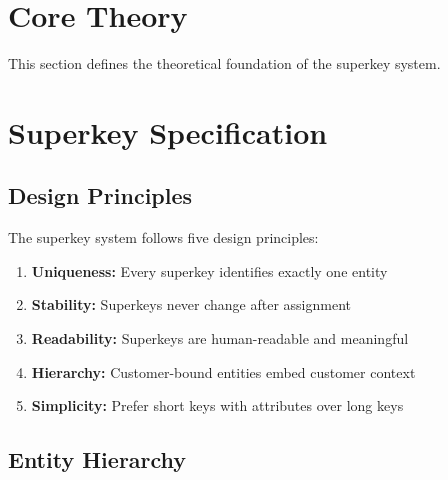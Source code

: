 \section{Core Theory}
\label{sec:superkey-theory}

This section defines the theoretical foundation of the superkey system.

\section{Superkey Specification}
\label{sec:superkey-specification}

\subsection{Design Principles}

The superkey system follows five design principles:

\begin{enumerate}
    \item \textbf{Uniqueness:} Every superkey identifies exactly one entity
    \item \textbf{Stability:} Superkeys never change after assignment
    \item \textbf{Readability:} Superkeys are human-readable and meaningful
    \item \textbf{Hierarchy:} Customer-bound entities embed customer context
    \item \textbf{Simplicity:} Prefer short keys with attributes over long keys
\end{enumerate}

\subsection{Entity Hierarchy}


